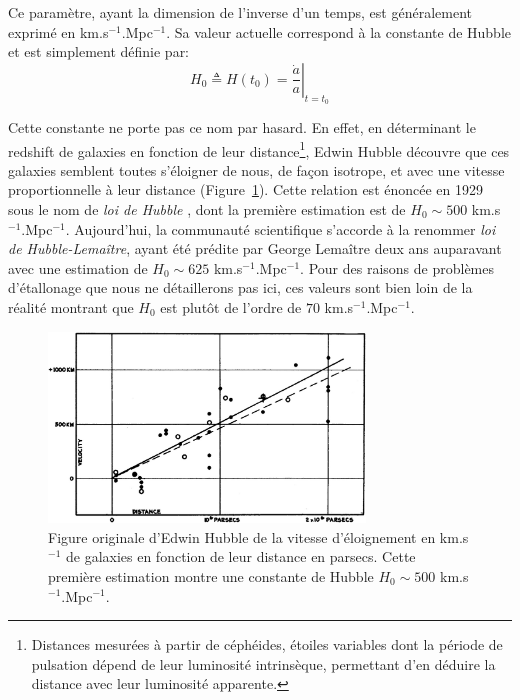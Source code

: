 \documentclass[../main/main.tex]{subfiles}
\begin{document}
Ce paramètre, ayant la dimension de l'inverse d'un temps, est
généralement exprimé en km.s$^{-1}$.Mpc$^{-1}$. Sa valeur actuelle
correspond à la constante de Hubble et est simplement définie par:
\begin{equation}
  \label{eq:hubbleconstante}
  H_{0}\triangleq H(t_{0}) = \left.\frac{\dot{a}}{a}\right\vert_{t=t_{0}}
\end{equation}

Cette constante ne porte pas ce nom par hasard. En effet, en déterminant
le redshift de galaxies en fonction de leur distance\footnote{Distances
  mesurées à partir de céphéides, étoiles variables dont la période de
  pulsation dépend de leur luminosité intrinsèque, permettant d'en
  déduire la distance avec leur luminosité apparente.}, Edwin Hubble
découvre que ces galaxies semblent toutes s'éloigner de nous, de façon
isotrope, et avec une vitesse proportionnelle à leur distance (Figure~\ref{fig:hubble}). Cette
relation est énoncée en 1929 sous le nom de \textit{loi de Hubble}
\citep{Hubble1929}, dont la première estimation est de $H_{0}\sim500$ km.s$^{-1}$.Mpc$^{-1}$. Aujourd'hui, la communauté scientifique s'accorde à
la renommer \textit{loi de Hubble-Lemaître}, ayant été prédite par George Lemaître deux ans auparavant
\citep{Lemaitre1927} avec une estimation de $H_{0}\sim625$
km.s$^{-1}$.Mpc$^{-1}$. Pour des raisons de problèmes d'étallonage que
nous ne détaillerons pas ici, ces valeurs sont bien loin de la réalité
montrant que $H_{0}$ est plutôt de l'ordre de $70$ km.s$^{-1}$.Mpc$^{-1}$.

\begin{figure}[ht]
  \centering
  \includegraphics[width=0.75\textwidth]{../figures/01_cosmology/Hubble.jpg}
  \caption[Figure originale d'Edwin Hubble de la vitesse d'éloignement
  de galaxies en fonction de leur distance.]{Figure originale d'Edwin
    Hubble \citep{Hubble1929} de la vitesse d'éloignement en km.s$^{-1}$
  de galaxies en fonction de leur distance en parsecs. Cette première
  estimation montre une constante de Hubble $H_{0}\sim500$ km.s$^{-1}$.Mpc$^{-1}$.}
\label{fig:hubble}
\end{figure}
\end{document}
